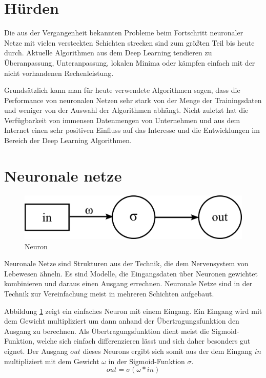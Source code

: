 \section{Hürden}

Die aus der Vergangenheit bekannten Probleme beim Fortschritt neuronaler Netze mit vielen versteckten Schichten strecken sind zum größten Teil bis heute durch. Aktuelle Algorithmen aus dem Deep Learning tendieren zu Überanpassung, Unteranpassung, lokalen Minima oder kämpfen einfach mit der nicht vorhandenen Rechenleistung.

Grundsätzlich kann man für heute verwendete Algorithmen sagen, dass die Performance von neuronalen Netzen sehr stark von der Menge der Trainingsdaten und weniger von der Auswahl der Algorithmen abhängt. Nicht zuletzt hat die Verfügbarkeit von immensen Datenmengen von Unternehmen und aus dem Internet einen sehr positiven Einfluss auf das Interesse und die Entwicklungen im Bereich der Deep Learning Algorithmen.


\section{Neuronale netze}

\begin{figure}
	\centering
	\includegraphics[scale=1]{images/neuron.png}
	\caption{Neuron}
	\label{fig:neuron}
\end{figure}

Neuronale Netze sind Strukturen aus der Technik, die dem Nervensystem von Lebewesen ähneln. Es sind Modelle, die Eingangsdaten über Neuronen gewichtet kombinieren und daraus einen Ausgang errechnen. Neuronale Netze sind in der Technik zur Vereinfachung meist in mehreren Schichten aufgebaut.

Abbildung \ref{fig:neuron} zeigt ein einfaches Neuron mit einem Eingang. Ein Eingang wird mit dem Gewicht multipliziert um dann anhand der Übertragungsfunktion den Ausgang zu berechnen. Als Übertragungsfunktion dient meist die Sigmoid-Funktion, welche sich einfach differenzieren lässt und sich daher besonders gut eignet. Der Ausgang $out$ dieses Neurons ergibt sich somit aus der dem Eingang $in$ multipliziert mit dem Gewicht $\omega$ in der Sigmoid-Funktion $\sigma$.
$$out = \sigma(\omega * in)$$


